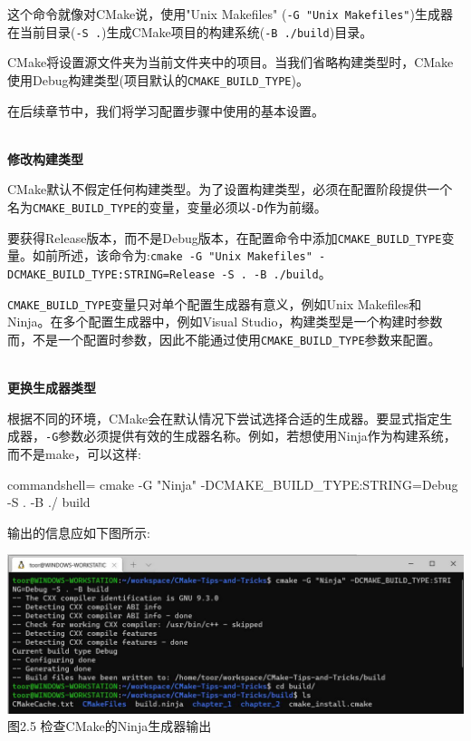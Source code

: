 这个命令就像对CMake说，使用"Unix Makefiles" (\texttt{-G "Unix Makefiles"})生成器在当前目录(\texttt{-S .})生成CMake项目的构建系统(\texttt{-B ./build})目录。

CMake将设置源文件夹为当前文件夹中的项目。当我们省略构建类型时，CMake使用Debug构建类型(项目默认的\texttt{CMAKE\_BUILD\_TYPE})。

在后续章节中，我们将学习配置步骤中使用的基本设置。

\hspace*{\fill} \\ %
\noindent
\textbf{修改构建类型}

CMake默认不假定任何构建类型。为了设置构建类型，必须在配置阶段提供一个名为\texttt{CMAKE\_BUILD\_TYPE}的变量，变量必须以\texttt{-D}作为前缀。

要获得Release版本，而不是Debug版本，在配置命令中添加\texttt{CMAKE\_BUILD\_TYPE}变量。如前所述，该命令为:\texttt{cmake -G "Unix Makefiles" -DCMAKE\_BUILD\_TYPE:STRING=Release -S . -B ./build}。

\begin{tcolorbox}[colback=webgreen!5!white,colframe=webgreen!75!black,title=Note]
\texttt{CMAKE\_BUILD\_TYPE}变量只对单个配置生成器有意义，例如Unix Makefiles和Ninja。在多个配置生成器中，例如Visual Studio，构建类型是一个构建时参数而，不是一个配置时参数，因此不能通过使用\texttt{CMAKE\_BUILD\_TYPE}参数来配置。
\end{tcolorbox}

\hspace*{\fill} \\ %
\noindent
\textbf{更换生成器类型}

根据不同的环境，CMake会在默认情况下尝试选择合适的生成器。要显式指定生成器，\texttt{-G}参数必须提供有效的生成器名称。例如，若想使用Ninja作为构建系统，而不是make，可以这样:

\begin{tcblisting}{commandshell={}}
cmake -G "Ninja" -DCMAKE_BUILD_TYPE:STRING=Debug -S . -B ./
build
\end{tcblisting}

输出的信息应如下图所示:

\begin{center}
\includegraphics[width=1.\textwidth]{content/1/chapter2/images/5.jpg}\\
图2.5 检查CMake的Ninja生成器输出
\end{center}

